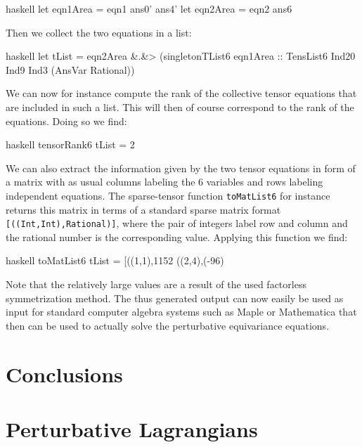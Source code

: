 \documentclass[a4paper,12pt, DIV=14, BCOR=5mm, twoside, headsepline]{scrbook}
\begin{document}
\begin{center}
\begin{cminted}{haskell}
let eqn1Area = eqn1 ans0' ans4' 
let eqn2Area = eqn2 ans6  
\end{cminted}
\end{center}
Then we collect the two equations in a list:
\begin{center}
\begin{cminted}{haskell}
let tList = eqn2Area &.&> (singletonTList6 eqn1Area ::
            TensList6 Ind20 Ind9 Ind3 (AnsVar Rational)) 
\end{cminted}
\end{center}
We can now for instance compute the rank of the collective tensor equations that are included in such a list. This will then of course correspond to the rank of the equations. Doing so we find:
\begin{center}
\begin{cminted}{haskell}
tensorRank6 tList = 2 
\end{cminted}
\end{center}
We can also extract the information given by the two tensor equations in form of a matrix with as usual columns labeling the 6 variables and rows labeling independent equations. The sparse-tensor function \texttt{toMatList6} for instance returns this matrix in terms of a standard sparse matrix format \texttt{[((Int,Int),Rational)]}, where the pair of integers label row and column and the rational number is the corresponding value. Applying this function we find:
\begin{center}
\begin{cminted}{haskell}
toMatList6 tList = [((1,1),1152 %
                   ((2,4),(-96) %
\end{cminted}
\end{center}
Note that the relatively large values are a result of the used factorless symmetrization method. The thus generated output can now easily be used as input for standard computer algebra systems such as Maple or Mathematica that then can be used to actually solve the perturbative equivariance equations.  

\chapter{Conclusions}

\appendix

\chapter{Perturbative Lagrangians}
\end{document}
